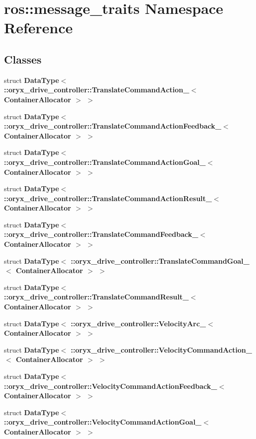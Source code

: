 \section{ros\-:\-:message\-\_\-traits \-Namespace \-Reference}
\label{namespaceros_1_1message__traits}
\subsection*{\-Classes}
\begin{DoxyCompactItemize}
\item 
struct {\bf \-Data\-Type$<$ \-::oryx\-\_\-drive\-\_\-controller\-::\-Translate\-Command\-Action\-\_\-$<$ Container\-Allocator $>$ $>$}
\item 
struct {\bf \-Data\-Type$<$ \-::oryx\-\_\-drive\-\_\-controller\-::\-Translate\-Command\-Action\-Feedback\-\_\-$<$ Container\-Allocator $>$ $>$}
\item 
struct {\bf \-Data\-Type$<$ \-::oryx\-\_\-drive\-\_\-controller\-::\-Translate\-Command\-Action\-Goal\-\_\-$<$ Container\-Allocator $>$ $>$}
\item 
struct {\bf \-Data\-Type$<$ \-::oryx\-\_\-drive\-\_\-controller\-::\-Translate\-Command\-Action\-Result\-\_\-$<$ Container\-Allocator $>$ $>$}
\item 
struct {\bf \-Data\-Type$<$ \-::oryx\-\_\-drive\-\_\-controller\-::\-Translate\-Command\-Feedback\-\_\-$<$ Container\-Allocator $>$ $>$}
\item 
struct {\bf \-Data\-Type$<$ \-::oryx\-\_\-drive\-\_\-controller\-::\-Translate\-Command\-Goal\-\_\-$<$ Container\-Allocator $>$ $>$}
\item 
struct {\bf \-Data\-Type$<$ \-::oryx\-\_\-drive\-\_\-controller\-::\-Translate\-Command\-Result\-\_\-$<$ Container\-Allocator $>$ $>$}
\item 
struct {\bf \-Data\-Type$<$ \-::oryx\-\_\-drive\-\_\-controller\-::\-Velocity\-Arc\-\_\-$<$ Container\-Allocator $>$ $>$}
\item 
struct {\bf \-Data\-Type$<$ \-::oryx\-\_\-drive\-\_\-controller\-::\-Velocity\-Command\-Action\-\_\-$<$ Container\-Allocator $>$ $>$}
\item 
struct {\bf \-Data\-Type$<$ \-::oryx\-\_\-drive\-\_\-controller\-::\-Velocity\-Command\-Action\-Feedback\-\_\-$<$ Container\-Allocator $>$ $>$}
\item 
struct {\bf \-Data\-Type$<$ \-::oryx\-\_\-drive\-\_\-controller\-::\-Velocity\-Command\-Action\-Goal\-\_\-$<$ Container\-Allocator $>$ $>$}

\end{DoxyCompactItemize}
